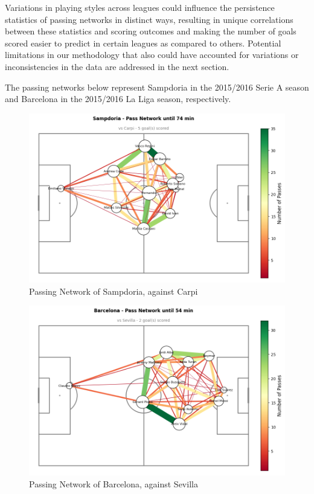 \documentclass[10pt,twocolumn]{article}
\begin{document}
Variations in playing styles across leagues could influence the persistence statistics of passing networks in distinct ways, resulting in unique correlations between these statistics and scoring outcomes and making the number of goals scored easier to predict in certain leagues as compared to others. Potential limitations in our methodology that also could have accounted for variations or inconsistencies in the data are addressed in the next section.

The passing networks below represent Sampdoria in the 2015/2016 Serie A season and Barcelona in the 2015/2016 La Liga season, respectively.

\begin{figure}[H]
    \centering
    \includegraphics[width=1\linewidth]{images/SerieA.png}
    \caption{Passing Network of Sampdoria, against Carpi}
    \label{fig:SerieA_passing_network}
\end{figure}
\begin{figure}[H]
    \centering
    \includegraphics[width=1\linewidth]{images/LaLiga.png}
    \caption{Passing Network of Barcelona, against Sevilla}
    \label{fig:LaLiga_passing_network}
\end{figure}
\end{document}
